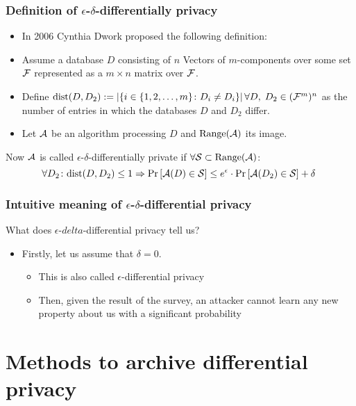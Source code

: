 \documentclass[xcolor=dvipsnames]{beamer}
\newcommand{\itm}{\pause\item}
\begin{document}
      \begin{frame} %
        \frametitle{Definition of $\epsilon$-$\delta$-differentially privacy}
       \begin{itemize}
         \itm In 2006 Cynthia Dwork proposed the following definition:
         \itm Assume a database $D$ consisting of $n$ Vectors of $m$-components over some set $\mathcal{F}$ represented as a $m\times n$ matrix over $\mathcal{F}$. 
         \itm Define $\dist{D}{D_2}:=\card{\{i\in\upto{m}\st D_i\neq D_i\}}\linebreak \forall D,\; D_2\in (\Set{F}^m)^n$ as the number of entries in which the databases $D$ and $D_2$ differ. %
         \itm Let $\mathcal{A}$ be an algorithm processing $D$ and $\mathrm{Range}(\mathcal{A})$ its image. 
       \end{itemize}
       \pause \begin{defn}
       	 \label{defn:diff-privacy}
       	 Now $\mathcal{A}$ is called $\epsilon$-$\delta$-differentially private if $\forall \mathcal{S}\subset \mathrm{Range}(\mathcal{A})$:
       	 $$\forall D_2\st \dist{D}{D_2}\leq 1\Rightarrow\Pr\left[\Set{A}(D)\in\Set{S}\right]\leq e^{\epsilon}\cdot \Pr\left[\Set{A}(D_2)\in\Set{S}\right]+\delta\ $$
       \end{defn}
      \end{frame}
      \begin{frame} %
      	\frametitle{Intuitive meaning of $\epsilon$-$\delta$-differential privacy}
      	What does $\epsilon$-$delta$-differential privacy tell us?
      	\begin{itemize}
      	  \itm Firstly, let us assume that $\delta=0$.
      	  \begin{itemize}
      	  	\itm[$\hookrightarrow$] This is also called $\epsilon$-differential privacy
      	  	\itm[$\hookrightarrow$] Then, given the result of the survey, an attacker cannot learn any new property about us with a significant probability 
      	  \end{itemize}  	
      	\end{itemize}
      \end{frame}

  \section{Methods to archive differential privacy}
\end{document}
